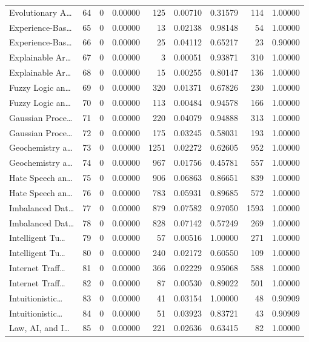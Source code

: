 \begin{table}
\begin{tabular}{lrrrrrrrr}
Evolutionary A… & 64 & 0 & 0.00000 & 125 & 0.00710 & 0.31579 & 114 & 1.00000 \\
Experience-Bas… & 65 & 0 & 0.00000 & 13 & 0.02138 & 0.98148 & 54 & 1.00000 \\
Experience-Bas… & 66 & 0 & 0.00000 & 25 & 0.04112 & 0.65217 & 23 & 0.90000 \\
Explainable Ar… & 67 & 0 & 0.00000 & 3 & 0.00051 & 0.93871 & 310 & 1.00000 \\
Explainable Ar… & 68 & 0 & 0.00000 & 15 & 0.00255 & 0.80147 & 136 & 1.00000 \\
Fuzzy Logic an… & 69 & 0 & 0.00000 & 320 & 0.01371 & 0.67826 & 230 & 1.00000 \\
Fuzzy Logic an… & 70 & 0 & 0.00000 & 113 & 0.00484 & 0.94578 & 166 & 1.00000 \\
Gaussian Proce… & 71 & 0 & 0.00000 & 220 & 0.04079 & 0.94888 & 313 & 1.00000 \\
Gaussian Proce… & 72 & 0 & 0.00000 & 175 & 0.03245 & 0.58031 & 193 & 1.00000 \\
Geochemistry a… & 73 & 0 & 0.00000 & 1251 & 0.02272 & 0.62605 & 952 & 1.00000 \\
Geochemistry a… & 74 & 0 & 0.00000 & 967 & 0.01756 & 0.45781 & 557 & 1.00000 \\
Hate Speech an… & 75 & 0 & 0.00000 & 906 & 0.06863 & 0.86651 & 839 & 1.00000 \\
Hate Speech an… & 76 & 0 & 0.00000 & 783 & 0.05931 & 0.89685 & 572 & 1.00000 \\
Imbalanced Dat… & 77 & 0 & 0.00000 & 879 & 0.07582 & 0.97050 & 1593 & 1.00000 \\
Imbalanced Dat… & 78 & 0 & 0.00000 & 828 & 0.07142 & 0.57249 & 269 & 1.00000 \\
Intelligent Tu… & 79 & 0 & 0.00000 & 57 & 0.00516 & 1.00000 & 271 & 1.00000 \\
Intelligent Tu… & 80 & 0 & 0.00000 & 240 & 0.02172 & 0.60550 & 109 & 1.00000 \\
Internet Traff… & 81 & 0 & 0.00000 & 366 & 0.02229 & 0.95068 & 588 & 1.00000 \\
Internet Traff… & 82 & 0 & 0.00000 & 87 & 0.00530 & 0.89022 & 501 & 1.00000 \\
Intuitionistic… & 83 & 0 & 0.00000 & 41 & 0.03154 & 1.00000 & 48 & 0.90909 \\
Intuitionistic… & 84 & 0 & 0.00000 & 51 & 0.03923 & 0.83721 & 43 & 0.90909 \\
Law, AI, and I… & 85 & 0 & 0.00000 & 221 & 0.02636 & 0.63415 & 82 & 1.00000 \\

\end{tabular}
\end{table}
